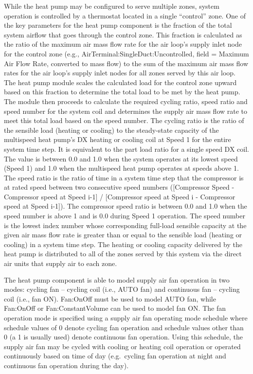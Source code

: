 While the heat pump may be configured to serve multiple zones, system operation is controlled by a thermostat located in a single ``control'' zone. One of the key parameters for the heat pump component is the fraction of the total system airflow that goes through the control zone. This fraction is calculated as the ratio of the maximum air mass flow rate for the air loop's supply inlet node for the control zone (e.g., AirTerminal:SingleDuct:Uncontrolled, field = Maximum Air Flow Rate, converted to mass flow) to the sum of the maximum air mass flow rates for the air loop's supply inlet nodes for all zones served by this air loop. The heat pump module scales the calculated load for the control zone upward based on this fraction to determine the total load to be met by the heat pump. The module then proceeds to calculate the required cycling ratio, speed ratio and speed number for the system coil and determines the supply air mass flow rate to meet this total load based on the speed number. The cycling ratio is the ratio of the sensible load (heating or cooling) to the steady-state capacity of the multispeed heat pump's DX heating or cooling coil at Speed 1 for the entire system time step. It is equivalent to the part load ratio for a single speed DX coil. The value is between 0.0 and 1.0 when the system operates at its lowest speed (Speed 1) and 1.0 when the multispeed heat pump operates at speeds above 1. The speed ratio is the ratio of time in a system time step that the compressor is at rated speed between two consecutive speed numbers ({[}Compressor Speed - Compressor speed at Speed i-1{]} / {[}Compressor speed at Speed i - Compressor speed at Speed i-1{]}). The compressor speed ratio is between 0.0 and 1.0 when the speed number is above 1 and is 0.0 during Speed 1 operation. The speed number is the lowest index number whose corresponding full-load sensible capacity at the given air mass flow rate is greater than or equal to the sensible load (heating or cooling) in a system time step. The heating or cooling capacity delivered by the heat pump is distributed to all of the zones served by this system via the direct air units that supply air to each zone.

The heat pump component is able to model supply air fan operation in two modes: cycling fan -- cycling coil (i.e., AUTO fan) and continuous fan -- cycling coil (i.e., fan ON). Fan:OnOff must be used to model AUTO fan, while Fan:OnOff or Fan:ConstantVolume can be used to model fan ON. The fan operation mode is specified using a supply air fan operating mode schedule where schedule values of 0 denote cycling fan operation and schedule values other than 0 (a 1 is usually used) denote continuous fan operation. Using this schedule, the supply air fan may be cycled with cooling or heating coil operation or operated continuously based on time of day (e.g.~cycling fan operation at night and continuous fan operation during the day).

